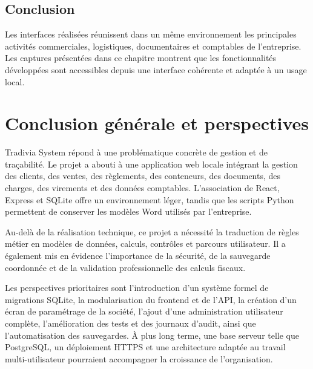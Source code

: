 \documentclass[12pt,a4paper,oneside]{report}
\begin{document}
\section*{Conclusion}

Les interfaces réalisées réunissent dans un même environnement les
principales activités commerciales, logistiques, documentaires et
comptables de l'entreprise. Les captures présentées dans ce chapitre
montrent que les fonctionnalités développées sont accessibles depuis
une interface cohérente et adaptée à un usage local.


\chapter*{Conclusion générale et perspectives}
Tradivia System répond à une problématique concrète de gestion et de traçabilité. Le projet a abouti à une application web locale intégrant la gestion des clients, des ventes, des règlements, des conteneurs, des documents, des charges, des virements et des données comptables. L'association de React, Express et SQLite offre un environnement léger, tandis que les scripts Python permettent de conserver les modèles Word utilisés par l'entreprise.

Au-delà de la réalisation technique, ce projet a nécessité la traduction de règles métier en modèles de données, calculs, contrôles et parcours utilisateur. Il a également mis en évidence l'importance de la sécurité, de la sauvegarde coordonnée et de la validation professionnelle des calculs fiscaux.

Les perspectives prioritaires sont l'introduction d'un système formel de migrations SQLite, la modularisation du frontend et de l'API, la création d'un écran de paramétrage de la société, l'ajout d'une administration utilisateur complète, l'amélioration des tests et des journaux d'audit, ainsi que l'automatisation des sauvegardes. À plus long terme, une base serveur telle que PostgreSQL, un déploiement HTTPS et une architecture adaptée au travail multi-utilisateur pourraient accompagner la croissance de l'organisation.
\end{document}
